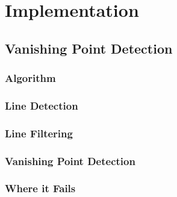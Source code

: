 \chapter{Implementation}
\label{chp:implementation}

\section{Vanishing Point Detection}

\subsection{Algorithm}

\subsection{Line Detection}

\subsection{Line Filtering}

\subsection{Vanishing Point Detection}

\subsection{Where it Fails}

